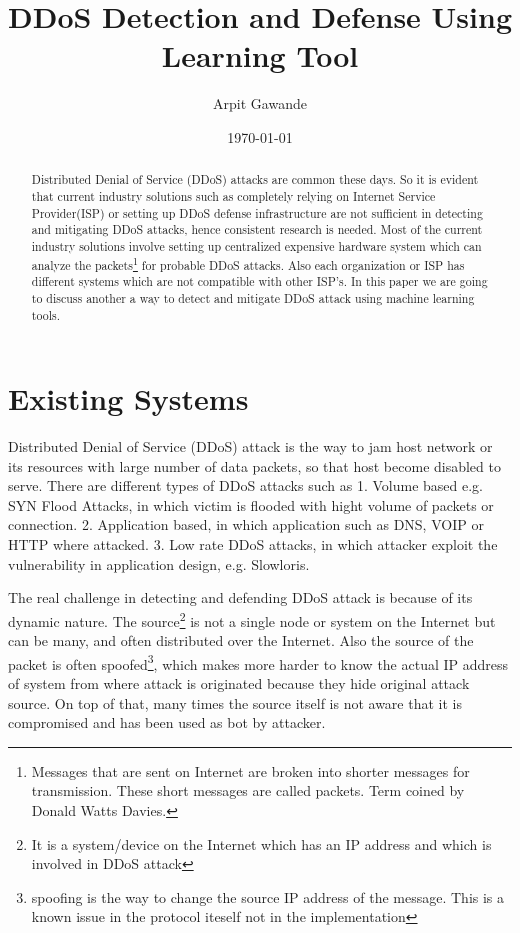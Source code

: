 \documentclass[10pt,oneside,a4paper]{article}
\author{Arpit Gawande}
\title{DDoS Detection and Defense Using Learning Tool}
\date{\today}
\begin{document}
\begin{abstract}
Distributed Denial of Service (DDoS) attacks are common these days\cite{ddosattacknews}. So it is evident that current industry solutions such as completely relying on Internet Service Provider(ISP) or setting up DDoS defense infrastructure are not sufficient in detecting and mitigating DDoS attacks, hence consistent research is needed. Most of the current industry solutions involve setting up centralized expensive hardware system which can analyze the packets\footnote{Messages that are sent on Internet are broken into shorter messages for transmission. These short messages are called packets. Term coined by Donald Watts Davies.} \cite{networkdatapacket} for probable DDoS attacks. Also each organization or ISP has different systems which are not compatible with other ISP's. In this paper we are going to discuss another a way to detect and mitigate DDoS attack using machine learning tools.
\end{abstract}

\section{Existing Systems}

Distributed Denial of Service (DDoS) attack is the way to jam host network or its resources with large number of data packets, so that host become disabled to serve. There are different types of DDoS attacks such as
1. Volume based e.g. SYN Flood Attacks, in which victim is flooded with hight volume of packets or connection.
2. Application based, in which application such as DNS, VOIP or HTTP where attacked.
3. Low rate DDoS attacks, in which attacker exploit the vulnerability in application design, e.g. Slowloris.
\cite{DDoSAttacks}

The real challenge in detecting and defending DDoS attack is because of its dynamic nature. The source\footnote{It is a system/device on the Internet which has an IP address and which is involved in DDoS attack} is not a single node or system on the Internet but can be many, and often distributed over the Internet. Also the source of the packet is often spoofed\footnote{spoofing is the way to change the source IP address of the message. This is a known issue in the protocol iteself not in the implementation}\cite{ipspoofing}, which makes more harder to know the actual IP address of system from where attack is originated because they hide original attack source. On top of that, many times the source itself is not aware that it is compromised and has been used as bot\cite{bot} by attacker.
\end{document}
